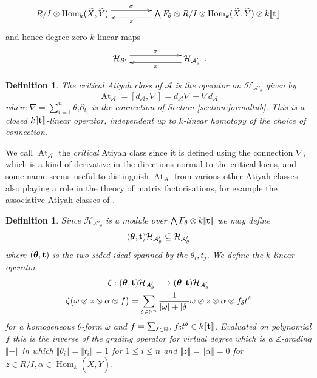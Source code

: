\documentclass[english,letter paper,12pt,leqno]{article}
\theoremstyle{example}
\newtheorem{definition}[theorem]{Definition}
\numberwithin{equation}{section}
\def\AA{\mathcal{A}}
\def\BB{\mathcal{B}}
\def\HH{\HH}
\def\HH{\mathcal{H}}
\def\Hom{\operatorname{Hom}}
\def\be{\begin{equation}}
\def\ee{\end{equation}}
\def\nZ{\mathds{Z}}
\DeclareMathOperator{\vAt}{At}
\begin{document}
\[
\xymatrix@C+2pc{
R/I \otimes \Hom_k(\widetilde{X},\widetilde{Y}) \ar@<1ex>[r]^-{\sigma} & \bigwedge F_\theta \otimes R/I \otimes \Hom_k(\widetilde{X},\widetilde{Y}) \otimes k \llbracket \bold{t} \rrbracket\ar@<1ex>[l]^-{\pi}
}
\]
and hence degree zero $k$-linear maps
\[
\xymatrix@C+3pc{
\HH_{\BB'} \ar@<1ex>[r]^-{\sigma} & \HH_{\AA'_\theta}\ar@<1ex>[l]^-{\pi}
}\,.
\]

\begin{definition}\label{defn:atiyah_class} The \emph{critical Atiyah class} of $\AA$ is the operator on $\HH_{\AA'_\theta}$ given by
\[
\vAt_{\AA} = [ d_{\AA}, \nabla ] = d_{\AA} \nabla + \nabla d_{\AA}
\]
where $\nabla = \sum_{i=1}^n \theta_i \partial_{t_i}$ is the connection of Section \ref{section:formaltub}. This is a closed $k\llbracket \bold{t} \rrbracket$-linear operator, independent up to $k$-linear homotopy of the choice of connection.
\end{definition}

We call $\vAt_{\AA}$ the \emph{critical} Atiyah class since it is defined using the connection $\nabla$, which is a kind of derivative in the directions normal to the critical locus, and some name seems useful to distinguish $\vAt_{\AA}$ from various other Atiyah classes also playing a role in the theory of matrix factorisations, for example the associative Atiyah classes of \cite{lgdual}.

\begin{definition}\label{definition:zeta} Since $\HH_{\AA'_\theta}$ is a module over $\bigwedge F_\theta \otimes k\llbracket \bold{t} \rrbracket$ we may define
\be
(\boldsymbol{\theta}, \bold{t}) \HH_{\AA'_\theta} \subseteq \HH_{\AA'_\theta}
\ee
where $(\boldsymbol{\theta}, \bold{t})$ is the two-sided ideal spanned by the $\theta_i, t_j$. We define the $k$-linear operator
\begin{gather*}
\zeta: (\boldsymbol{\theta}, \bold{t}) \HH_{\AA'_\theta} \lto (\boldsymbol{\theta}, \bold{t}) \HH_{\AA'_\theta}\\
\zeta\big( \omega \otimes z \otimes \alpha \otimes f \big) = \sum_{\delta \in \mathbb{N}^n} \frac{1}{|\omega| + |\delta|} \omega \otimes z \otimes \alpha \otimes f_\delta t^\delta
\end{gather*}
for a homogeneous $\theta$-form $\omega$ and $f = \sum_{\delta \in \mathbb{N}^n} f_\delta t^\delta \in k\llbracket \bold{t} \rrbracket$. Evaluated on polynomial $f$ this is the inverse of the grading operator for \emph{virtual degree} which is a $\nZ$-grading $\Vert - \Vert$ in which $\Vert\theta_i\Vert = \Vert t_i \Vert = 1$ for $1 \le i \le n$ and $\Vert z \Vert = \Vert \alpha \Vert = 0$ for $z \in R/I, \alpha \in \Hom_k(\widetilde{X},\widetilde{Y})$.
\end{definition}
\end{document}
